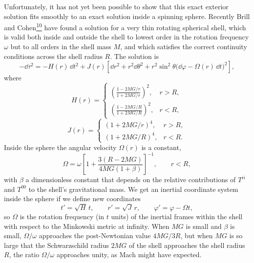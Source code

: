 Unfortunately, it has not yet been possible to show that this exact
exterior solution fits smoothly to an exact solution inside a spinning
sphere. Recently Brill and
Cohen\hyperref[ch9-ref-10]{\textsuperscript{10}} have found a solution for
a very thin rotating spherical shell, which is valid both inside and
outside the shell to lowest order in the rotation frequency \(\omega\) but
to all orders in the shell mass \(M\), and which satisfies the correct
continuity conditions across the shell radius \(R\). The solution is
\[
  -\dd\tau^2
  =
  -H(r)\,\dd t^2
  +J(r)\left[
    \dd r^2+r^2\dd\theta^2
    +r^2\sin^2\theta\bigl(\dd\varphi-\Omega(r)\,\dd t\bigr)^2
  \right],
\]
where
\[
  H(r)=
  \begin{cases}
    \displaystyle
    \left(\frac{1-2MG/r}{1+2MG/r}\right)^2,
      & r>R,\\[8pt]
    \displaystyle
    \left(\frac{1-2MG/R}{1+2MG/R}\right)^2,
      & r<R,
  \end{cases}
\]
\[
  J(r)=
  \begin{cases}
    (1+2MG/r)^4, & r>R,\\
    (1+2MG/R)^4, & r<R.
  \end{cases}
\]
Inside the sphere the angular velocity \(\Omega(r)\) is a constant,
\[
  \Omega
  =
  \omega\left[
    1+\frac{3(R-2MG)}{4MG(1+\beta)}
  \right]^{-1},
  \qquad r<R,
\]
with \(\beta\) a dimensionless constant that depends on the relative
contributions of \(T^{ii}\) and \(T^{00}\) to the shell's gravitational
mass. We get an inertial coordinate system inside the sphere if we define
new coordinates
\[
  t'=\sqrt H\,t,
  \qquad
  r'=\sqrt J\,r,
  \qquad
  \varphi'=\varphi-\Omega t,
\]
so \(\Omega\) is the rotation frequency (in \(t\) units) of the inertial
frames within the shell with respect to the Minkowski metric at infinity.
When \(MG\) is small and \(\beta\) is small, \(\Omega/\omega\) approaches
the post-Newtonian value \(4MG/3R\), but when \(MG\) is so large that the
Schwarzschild radius \(2MG\) of the shell approaches the shell radius
\(R\), the ratio \(\Omega/\omega\) approaches unity, as Mach might have
expected.
